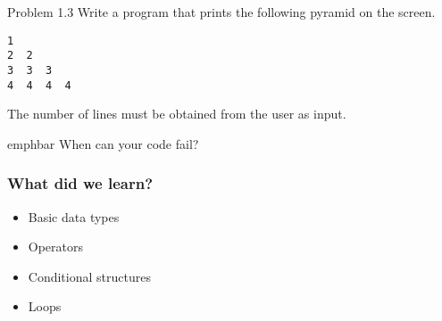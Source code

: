 \documentclass[14pt,compress]{beamer}
\newcommand{\emphbar}[1]
{\begin{beamercolorbox}[rounded=true]{emphbar} 
      {#1}
 \end{beamercolorbox}
}
\newcounter{time}
\newcommand{\inctime}[1]{\addtocounter{time}{#1}{\tiny \thetime\ m}}
\begin{document}
\begin{frame}[fragile]{Problem 1.3}
  Write a program that prints the following pyramid on the screen. 
  \begin{lstlisting}
1
2  2
3  3  3
4  4  4  4
  \end{lstlisting}
The number of lines must be obtained from the user as input.\\
\pause
\emphbar{When can your code fail?}
\inctime{5}
\end{frame}

\begin{frame}[fragile]
  \frametitle{What did we learn?}
  \begin{itemize}
    \item Basic data types
    \item Operators
    \item Conditional structures
    \item Loops
  \end{itemize}
\end{frame}
\end{document}
